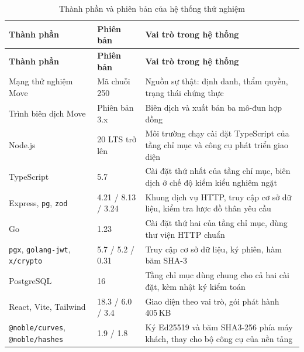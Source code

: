 \begin{longtable}{|p{3.4cm}|p{2.9cm}|p{7.3cm}|}
\caption{Thành phần và phiên bản của hệ thống thử nghiệm}
\label{tab:system-environment}
\\
\hline
\textbf{Thành phần} & \textbf{Phiên bản} & \textbf{Vai trò trong hệ thống} \\
\hline
\endfirsthead

\hline
\textbf{Thành phần} & \textbf{Phiên bản} & \textbf{Vai trò trong hệ thống} \\
\hline
\endhead

\hline
\endfoot

\hline
\endlastfoot

Mạng thử nghiệm Move
& Mã chuỗi 250
& Nguồn sự thật: định danh, thẩm quyền, trạng thái chứng thực \\
\hline

Trình biên dịch Move
& Phiên bản 3.x
& Biên dịch và xuất bản ba mô-đun hợp đồng \\
\hline

Node.js
& 20 LTS trở lên
& Môi trường chạy cài đặt TypeScript của tầng chỉ mục và công cụ phát triển giao diện \\
\hline

TypeScript
& 5.7
& Cài đặt thứ nhất của tầng chỉ mục, biên dịch ở chế độ kiểm kiểu nghiêm ngặt \\
\hline

Express, \texttt{pg}, \texttt{zod}
& 4.21 / 8.13 / 3.24
& Khung dịch vụ HTTP, truy cập cơ sở dữ liệu, kiểm tra lược đồ thân yêu cầu \\
\hline

Go
& 1.23
& Cài đặt thứ hai của tầng chỉ mục, dùng thư viện HTTP chuẩn \\
\hline

\texttt{pgx}, \texttt{golang-jwt}, \texttt{x/crypto}
& 5.7 / 5.2 / 0.31
& Truy cập cơ sở dữ liệu, ký phiên, hàm băm SHA-3 \\
\hline

PostgreSQL
& 16
& Tầng chỉ mục dùng chung cho cả hai cài đặt, kèm nhật ký kiểm toán \\
\hline

React, Vite, Tailwind
& 18.3 / 6.0 / 3.4
& Giao diện theo vai trò, gói phát hành 405\,KB \\
\hline

\texttt{@noble/curves}, \texttt{@noble/hashes}
& 1.9 / 1.8
& Ký Ed25519 và băm SHA3-256 phía máy khách, thay cho bộ công cụ của nền tảng \\
\hline


\end{longtable}
